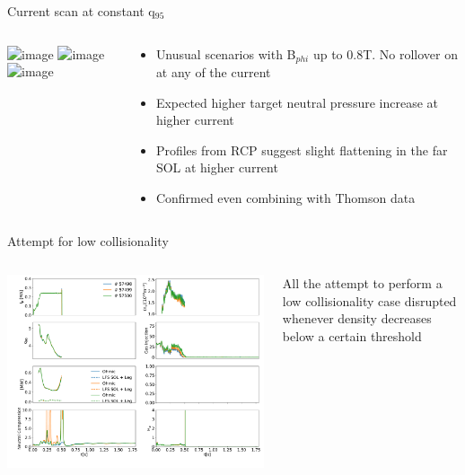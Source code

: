 \documentclass[10pt, compress]{beamer}
\newcommand\Fontvi{\fontsize{8}{7.2}\selectfont}
\begin{document}
\begin{frame}{Current scan at constant q$_{95}$}
\Fontvi
  \begin{columns}[c]
    \begin{column}{0.7\textwidth}
      \includegraphics<1>[width=8.cm]{../../Experiments/TCV/analysis/pdfbox/CurrentScanConstantQ95}
      \includegraphics<2>[width=8.cm]{../../Experiments/TCV/analysis/pdfbox/DensityProfileCurrentScanConstantQ95SOL}
      \includegraphics<3>[width=8.cm]{../../Experiments/TCV/analysis/pdfbox/DensityProfileCurrentScanConstantQ95}
    \end{column}
    \begin{column}{0.3\textwidth}
      \begin{itemize}
        \item Unusual scenarios with B$_{phi}$ up to 0.8T. \alert{No rollover
          on at any of the current}
        \item Expected higher target neutral pressure increase at
          higher current
        \item<2-> Profiles from RCP suggest slight flattening in the
          far SOL at higher current
        \item<3-> Confirmed even combining with Thomson data
        \end{itemize}
    \end{column}
  \end{columns}
\end{frame}
\begin{frame}{Attempt for low collisionality}
  \begin{columns}[c]
    \begin{column}{0.7\textwidth}
      \includegraphics[width=8.cm]{../../Experiments/TCV/analysis/pdfbox/LowCollisionalityAttempt}
    \end{column}
    \begin{column}{0.3\textwidth}
      All the attempt to perform a low collisionality case disrupted
      whenever density decreases below a certain threshold
    \end{column}
  \end{columns}
\end{frame}
\end{document}
